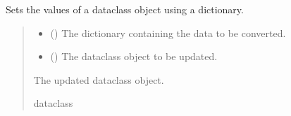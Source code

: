 \documentclass[a4paper,11pt,english,openany]{sphinxmanual}
\begin{document}

\begin{fulllineitems}
\label{\detokenize{api/spyice.utils.helpers:src.spyice.utils.helpers.set_dataclass}}
\pysigstartsignatures
\pysiglinewithargsret
{}
{\sphinxparamcomma {}}
{}
\pysigstopsignatures
\sphinxAtStartPar
Sets the values of a dataclass object using a dictionary.
\begin{quote}\begin{description}
\begin{itemize}
\item {} 
\sphinxAtStartPar
{} () \textendash{} The dictionary containing the data to be converted.

\item {} 
\sphinxAtStartPar
{} () \textendash{} The dataclass object to be updated.

\end{itemize}

\sphinxAtStartPar
The updated dataclass object.

\sphinxAtStartPar
dataclass

\end{description}\end{quote}

\end{fulllineitems}

\end{document}
